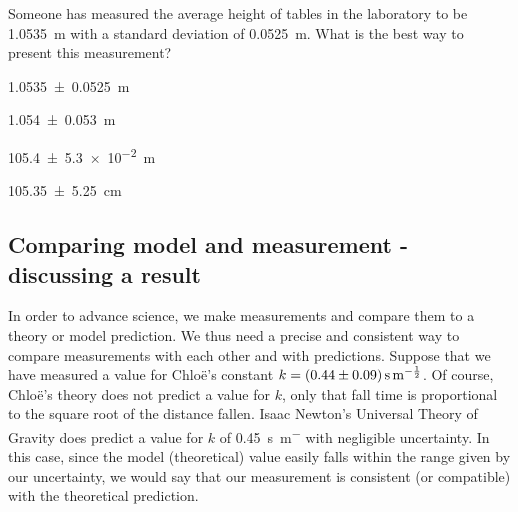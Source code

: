 \begin{checkpoint}
\begin{MCquestion}{Someone has measured the average height of tables in the laboratory to be \SI{1.0535}{m} with a standard deviation of \SI{0.0525}{m}. What is the best way to present this measurement?}
\item \SI{1.0535\pm 0.0525}{m}
\item \SI{1.054\pm 0.053}{m}
\item \SI{105.4\pm 5.3e-2}{m}
\item \SI{105.35\pm 5.25}{cm}
\end{MCquestion}
\end{checkpoint}

\subsection{Comparing model and measurement - discussing a result}
In order to advance science, we make measurements and compare them to a theory or model prediction. We thus need a precise and consistent way to compare measurements with each other and with predictions. Suppose that we have measured a value for Chlo\"e's constant $k= \SI{0.44 \pm 0.09}{s.m^{-\frac{1}{2}}}$. Of course, Chlo\"e's theory does not predict a value for $k$, only that fall time is proportional to the square root of the distance fallen. Isaac Newton's Universal Theory of Gravity does predict a value for $k$ of \SI{0.45}{s.m^{-}} with negligible uncertainty. In this case, since the model (theoretical) value easily falls within the range given by our uncertainty, we would say that our measurement is consistent (or compatible) with the theoretical prediction. 

